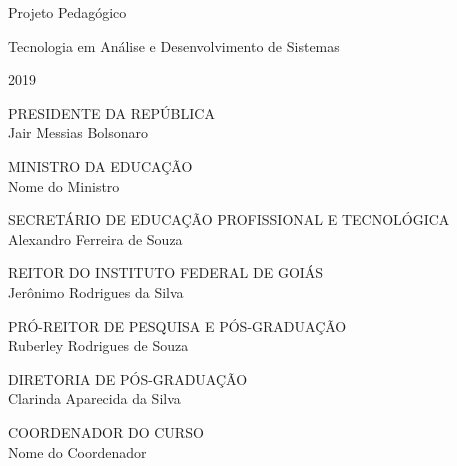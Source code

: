 \documentclass[11pt,fleqn]{book} %
\begin{document}
\let\cleardoublepage\clearpage

\renewcommand{\chaptername}{Capítulo}
\renewcommand{\figurename}{Fig.}

\begingroup
	\thispagestyle{empty}
	
	
	
	
	\vspace*{4.5cm}
	
	\centering
	\par
	{\Huge Projeto Pedagógico}\vspace*{1.5cm}
	\par
	\fontsize{40}{40}
	\selectfont
	Tecnologia em Análise e Desenvolvimento de Sistemas\vspace*{10cm}
	\par
	{\Huge 2019}
	\par
\endgroup
\pagebreak

\begin{center}
	\par
	{\large PRESIDENTE DA REPÚBLICA \\ Jair Messias Bolsonaro}\vspace*{1cm}
	\par
	{\large MINISTRO DA EDUCAÇÃO \\ Nome do Ministro}\vspace*{1cm}
	\par
	{\large SECRETÁRIO DE EDUCAÇÃO PROFISSIONAL E TECNOLÓGICA \\ Alexandro Ferreira de Souza}\vspace*{1cm}
	\par
	{\large REITOR DO INSTITUTO FEDERAL DE GOIÁS \\ Jerônimo Rodrigues da Silva}\vspace*{1cm}
	\par
	{\large PRÓ-REITOR DE PESQUISA E PÓS-GRADUAÇÃO \\ Ruberley Rodrigues de Souza}\vspace*{1cm}
	\par
	{\large DIRETORIA DE PÓS-GRADUAÇÃO \\ Clarinda Aparecida da Silva}\vspace*{1cm}
	\par
	{\large COORDENADOR DO CURSO \\ Nome do Coordenador}\vspace*{1cm}
\end{center}
\end{document}
